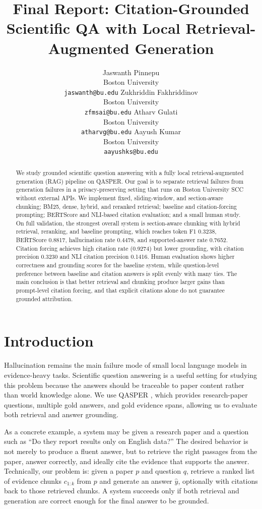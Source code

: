 \documentclass[11pt]{article}
\title{Final Report: Citation-Grounded Scientific QA with Local Retrieval-Augmented Generation}
\author{
  Jaswanth Pinnepu \\
  Boston University \\
  \texttt{jaswanth@bu.edu}
  \And
  Zukhriddin Fakhriddinov \\
  Boston University \\
  \texttt{zfmsai@bu.edu}
  \And
  Atharv Gulati \\
  Boston University \\
  \texttt{atharvg@bu.edu}
  \And
  Aayush Kumar \\
  Boston University \\
  \texttt{aayushks@bu.edu}
}
\begin{document}
\maketitle

\begin{abstract}
We study grounded scientific question answering with a fully local retrieval-augmented generation (RAG) pipeline on QASPER. Our goal is to separate retrieval failures from generation failures in a privacy-preserving setting that runs on Boston University SCC without external APIs. We implement fixed, sliding-window, and section-aware chunking; BM25, dense, hybrid, and reranked retrieval; baseline and citation-forcing prompting; BERTScore and NLI-based citation evaluation; and a small human study. On full validation, the strongest overall system is section-aware chunking with hybrid retrieval, reranking, and baseline prompting, which reaches token F1 0.3238, BERTScore 0.8817, hallucination rate 0.4478, and supported-answer rate 0.7652. Citation forcing achieves high citation rate (0.9274) but lower grounding, with citation precision 0.3230 and NLI citation precision 0.1416. Human evaluation shows higher correctness and grounding scores for the baseline system, while question-level preference between baseline and citation answers is split evenly with many ties. The main conclusion is that better retrieval and chunking produce larger gains than prompt-level citation forcing, and that explicit citations alone do not guarantee grounded attribution.
\end{abstract}

\section{Introduction}

Hallucination remains the main failure mode of small local language models in evidence-heavy tasks. Scientific question answering is a useful setting for studying this problem because the answers should be traceable to paper content rather than world knowledge alone. We use QASPER \citep{dasigi2021qasper}, which provides research-paper questions, multiple gold answers, and gold evidence spans, allowing us to evaluate both retrieval and answer grounding.

As a concrete example, a system may be given a research paper and a question such as ``Do they report results only on English data?'' The desired behavior is not merely to produce a fluent answer, but to retrieve the right passages from the paper, answer correctly, and ideally cite the evidence that supports the answer. Technically, our problem is: given a paper $p$ and question $q$, retrieve a ranked list of evidence chunks $c_{1:k}$ from $p$ and generate an answer $\hat{y}$, optionally with citations back to those retrieved chunks. A system succeeds only if both retrieval and generation are correct enough for the final answer to be grounded.
\end{document}
